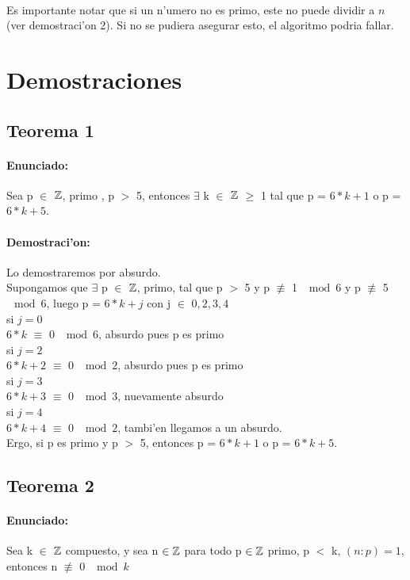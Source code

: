 \paragraph{}
Es importante notar que si un n'umero no es primo, este no puede dividir a $n$ (ver demostraci'on 2). Si 
no se pudiera asegurar esto, el algoritmo podria fallar.

\section{Demostraciones}
\subsection{Teorema 1}
\paragraph{Enunciado:}
Sea p $\in$ ${\mathbb Z}$, primo , p $>$ 5, entonces $\exists$ k $\in$ ${\mathbb Z}$ $\geq$ 1  tal que p = $6*k+1$ o p = $6*k +5$.
\paragraph{Demostraci'on:}
Lo demostraremos por absurdo.\\ 
Supongamos que $\exists$ p $\in$ ${\mathbb Z}$, primo, tal que p $>$ 5 y p $\not\equiv$ 1  $\mod{6}$ y p
$\not\equiv$ 5  $\mod{6}$, luego p = $6*k + j$ con j $\in$ ${0,2,3,4}$ \\
si $j = 0$\\
$6*k$ $\equiv$ 0  $\mod{6}$, absurdo pues p es primo\\
si $j = 2$\\
$6*k + 2$ $\equiv$ 0  $\mod{2}$, absurdo pues p es primo \\
si $j = 3$\\
$6*k + 3$ $\equiv$ 0  $\mod{3}$, nuevamente absurdo\\
si $j = 4$\\
$6*k + 4$ $\equiv$ 0  $\mod{2}$, tambi'en llegamos a un absurdo.\\
Ergo, si p es primo y p $>$ 5, entonces p = $6*k+1$ o p = $6*k +5$.

\subsection{Teorema 2}
\paragraph{Enunciado:}
Sea k $\in$ ${\mathbb Z}$ compuesto, y sea n ${\in {\mathbb Z}}$ para todo p ${\in {\mathbb Z}}$ primo, p $<$ k, $(n:p) = 1$, entonces n $\not\equiv$ 0 $\mod{k}$
